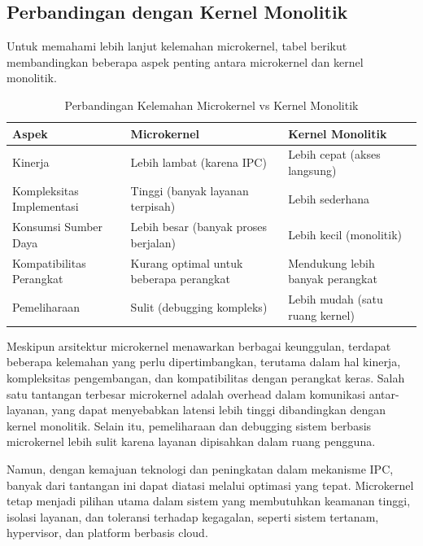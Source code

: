 \subsection{Perbandingan dengan Kernel Monolitik}

Untuk memahami lebih lanjut kelemahan microkernel, tabel berikut membandingkan beberapa aspek penting antara microkernel dan kernel monolitik.

\begin{table}[h]
	\centering
	\renewcommand{\arraystretch}{1.3}
	\begin{tabular}{|p{}|p{}|p{}|}
		\hline
		\textbf{Aspek} & \textbf{Microkernel} & \textbf{Kernel Monolitik} \\
		\hline
		Kinerja & Lebih lambat (karena IPC) & Lebih cepat (akses langsung) \\
		Kompleksitas Implementasi & Tinggi (banyak layanan terpisah) & Lebih sederhana \\
		Konsumsi Sumber Daya & Lebih besar (banyak proses berjalan) & Lebih kecil (monolitik) \\
		Kompatibilitas Perangkat & Kurang optimal untuk beberapa perangkat & Mendukung lebih banyak perangkat \\
		Pemeliharaan & Sulit (debugging kompleks) & Lebih mudah (satu ruang kernel) \\
		\hline
	\end{tabular}
	\caption{Perbandingan Kelemahan Microkernel vs Kernel Monolitik}
	\label{tab:microkernel_vs_monolithic_weakness}
\end{table}


Meskipun arsitektur microkernel menawarkan berbagai keunggulan, terdapat beberapa kelemahan yang perlu dipertimbangkan, terutama dalam hal kinerja, kompleksitas pengembangan, dan kompatibilitas dengan perangkat keras. Salah satu tantangan terbesar microkernel adalah overhead dalam komunikasi antar-layanan, yang dapat menyebabkan latensi lebih tinggi dibandingkan dengan kernel monolitik. Selain itu, pemeliharaan dan debugging sistem berbasis microkernel lebih sulit karena layanan dipisahkan dalam ruang pengguna.

Namun, dengan kemajuan teknologi dan peningkatan dalam mekanisme IPC, banyak dari tantangan ini dapat diatasi melalui optimasi yang tepat. Microkernel tetap menjadi pilihan utama dalam sistem yang membutuhkan keamanan tinggi, isolasi layanan, dan toleransi terhadap kegagalan, seperti sistem tertanam, hypervisor, dan platform berbasis cloud.


